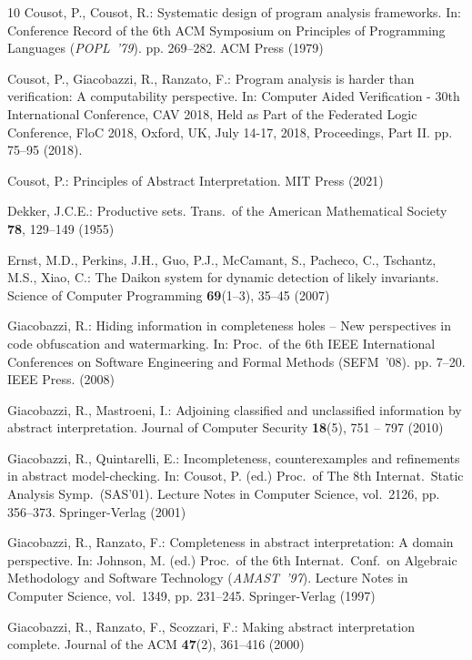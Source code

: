 \documentclass[runningheads]{llncs}
\begin{document}
\begin{thebibliography}{10}
Cousot, P., Cousot, R.: Systematic design of program analysis frameworks. In:
  Conference Record of the 6th ACM Symposium on Principles of Programming
  Languages {\rm ({\em POPL~'79\/})}. pp. 269--282. ACM Press (1979)

Cousot, P., Giacobazzi, R., Ranzato, F.: Program analysis is harder than
  verification: {A} computability perspective. In: Computer Aided Verification
  - 30th International Conference, {CAV} 2018, Held as Part of the Federated
  Logic Conference, FloC 2018, Oxford, UK, July 14-17, 2018, Proceedings, Part
  {II}. pp. 75--95 (2018). 

Cousot, P.: Principles of Abstract Interpretation. MIT Press (2021)

Dekker, J.C.E.: Productive sets. Trans.\ of the American Mathematical Society
  \textbf{78},  129--149 (1955)

Ernst, M.D., Perkins, J.H., Guo, P.J., McCamant, S., Pacheco, C., Tschantz,
  M.S., Xiao, C.: The {Daikon} system for dynamic detection of likely
  invariants. Science of Computer Programming  \textbf{69}(1--3),  35--45
  (2007)

Giacobazzi, R.: Hiding information in completeness holes -- {N}ew perspectives
  in code obfuscation and watermarking. In: Proc.\ of the 6th IEEE
  International Conferences on Software Engineering and Formal Methods
  (SEFM~'08). pp. 7--20. IEEE Press. (2008)

Giacobazzi, R., Mastroeni, I.: Adjoining classified and unclassified
  information by abstract interpretation. Journal of Computer Security
  \textbf{18}(5),  751 -- 797 (2010)

Giacobazzi, R., Quintarelli, E.: Incompleteness, counterexamples and
  refinements in abstract model-checking. In: Cousot, P. (ed.) Proc.\ of The
  8th Internat.\ Static Analysis Symp.\ (SAS'01). Lecture Notes in Computer
  Science, vol.~2126, pp. 356--373. Springer-Verlag (2001)

Giacobazzi, R., Ranzato, F.: Completeness in abstract interpretation: {A}
  domain perspective. In: Johnson, M. (ed.) Proc.\ of the 6th Internat.\ Conf.\
  on Algebraic Methodology and Software Technology {\rm ({\em AMAST~'97\/})}.
  Lecture Notes in Computer Science, vol.~1349, pp. 231--245. Springer-Verlag
  (1997)

Giacobazzi, R., Ranzato, F., Scozzari, F.: Making abstract interpretation
  complete. Journal of the {ACM}  \textbf{47}(2),  361--416 (2000)


\end{thebibliography}
\end{document}

